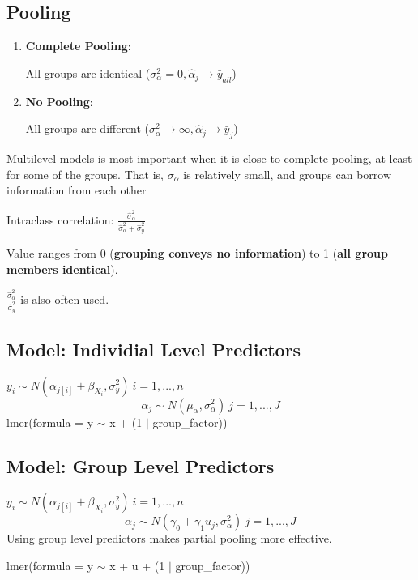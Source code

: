 \documentclass[10pt,landscape, fleqn]{article}
\begin{document}
\begin{multicols}{3}
			\subsection{Pooling}
				\begin{enumerate}
					\item \textbf{Complete Pooling}: \par All groups are identical ($\sigma_\alpha^2 = 0 , \hat{\alpha}_j \rightarrow \bar{y}_{all}$)
					\item \textbf{No Pooling}: \par All groups are different ($\sigma_\alpha^2 \rightarrow \infty, \hat{\alpha}_j \rightarrow \bar{y}_j$)
				\end{enumerate}
				Multilevel models is most important when it is close to complete pooling, at least for some of the groups. That is, $\sigma_\alpha$ is relatively small, and groups can borrow information from each other \par 
				Intraclass correlation: $\frac{\hat{\sigma}_\alpha^2}{\hat{\sigma}_\alpha^2+\hat{\sigma}_y^2}$ \par 
				Value ranges from 0 (\textbf{grouping conveys no information}) to 1 (\textbf{all group members identical}). \par 
				$\frac{\hat{\sigma}_\alpha^2}{\hat{\sigma}_y^2}$ is also often used.
			\subsection{Model: Individial Level Predictors}
				$ y_i \sim N(\alpha_{j[i]}+\beta_{X_i}, \sigma_y^2)\ i=1,...,n $
				\[ \alpha_j \sim N(\mu_\alpha, \sigma^2_\alpha)\ j=1,...,J \]
				lmer(formula = y $\sim$ x + (1 $|$ group\_factor))
			\subsection{Model: Group Level Predictors}
				$ y_i \sim N(\alpha_{j[i]}+\beta_{X_i}, \sigma_y^2)\ i=1,...,n $
				\[ \alpha_j \sim N(\gamma_0+\gamma_1u_j, \sigma^2_\alpha)\ j=1,...,J \]			
				Using group level predictors makes partial pooling more effective. \par 
				lmer(formula = y $\sim$ x + u + (1 $|$ group\_factor))

\end{multicols}
\end{document}
